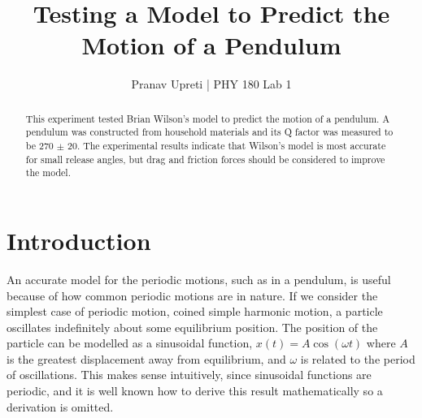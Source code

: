 \documentclass[notitlepage,twocolumn, 12pt]{report}
\title{Testing a Model to Predict the Motion of a Pendulum} %
\author{Pranav Upreti | PHY 180 Lab 1}
\begin{document}
    \maketitle
    \setcounter{page}{1}
    \begin{abstract}
    This experiment tested Brian Wilson's model to predict the motion of a pendulum. A pendulum was constructed from household materials and its Q factor was measured to be 270 $\pm$ 20. The experimental results indicate that Wilson's model is most accurate for small release angles, but drag and friction forces should be considered to improve the model. 
    \end{abstract}
    \section{Introduction}
    An accurate model for the periodic motions, such as in a pendulum, is useful because of how common periodic motions are in nature. If we consider the simplest case of periodic motion, coined simple harmonic motion, a particle oscillates indefinitely about some equilibrium position. The position of the particle can be modelled as a sinusoidal function, $x(t) = A\cos(\omega t)$ where $A$ is the greatest displacement away from equilibrium, and $\omega$ is related to the period of oscillations. This makes sense intuitively, since sinusoidal functions are periodic, and it is well known how to derive this result mathematically so a derivation is omitted. 
\end{document}
